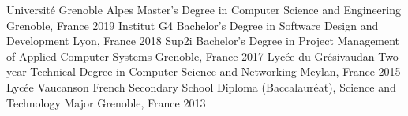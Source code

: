 

\begin{cventries}

  \cventryy
    {Université Grenoble Alpes} %
    {Master's Degree in Computer Science and Engineering} %
    {Grenoble, France} %
    {2019} %
  \cventryy
    {Institut G4} %
    {Bachelor's Degree in Software Design and Development} %
    {Lyon, France} %
    {2018} %
  \cventryy
    {Sup2i} %
    {Bachelor's Degree in Project Management of Applied Computer Systems} %
    {Grenoble, France} %
    {2017} %
  \cventryy
    {Lycée du Grésivaudan} %
    {Two-year Technical Degree in Computer Science and Networking} %
    {Meylan, France} %
    {2015} %
  \cventryy
    {Lycée Vaucanson} %
    {French Secondary School Diploma (Baccalauréat), Science and Technology Major} %
    {Grenoble, France} %
    {2013} %
\end{cventries}
